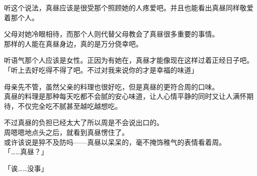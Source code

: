 听这个说法，真昼应该是很受那个照顾她的人疼爱吧。并且也能看出真昼同样敬爱着那个人。

父母对她冷眼相待，而那个人则代替父母教会了真昼很多重要的事情。\\

那样的人能在真昼身边，真的是万分侥幸吧。

听语气那个人应该是女性。正因为有她在，真昼才能像现在这样过着正经日子吧。\\

「听上去好吃得不得了吧。不过对我来说你的才是幸福的味道」

母亲先不管，虽然父亲的料理也很好吃，但是真昼的更符合周的口味。\\

真昼的料理是那种每天吃都不会腻的安心味道，让人心情平静的同时又让人满怀期待，不仅完全吃不腻甚至越吃越想吃。

不过真昼的负担已经太大了所以周是不会说出口的。\\

周嗯嗯地点头之后，就看到真昼愣住了。\\

或许该说是猝不及防吗——真昼以呆呆的，毫不掩饰稚气的表情看着周。\\

「……真昼？」

「诶……没事」\\

